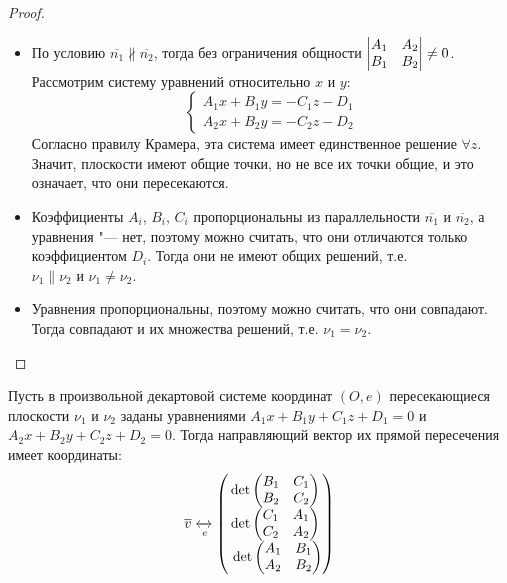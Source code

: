 \begin{proof}~
	\begin{itemize}
		\item По условию $\overline{n_1} \nparallel \overline{n_2}$, тогда без ограничения общности $\begin{vmatrix}A_1 & A_2\\B_1 & B_2\end{vmatrix} \hm{\ne} 0$. Рассмотрим систему уравнений относительно $x$ и $y$:
		\[\left\{
		\begin{aligned}
		A_1x + B_1y = -C_1z -D_1\\
		A_2x + B_2y = -C_2z -D_2
		\end{aligned}
		\right.
		\]
		Согласно правилу Крамера, эта система имеет единственное решение $\forall z$. Значит, плоскости имеют общие точки, но не все их точки общие, и это означает, что они пересекаются.
		\item Коэффициенты $A_i$, $B_i$, $C_i$ пропорциональны из параллельности $\overline{n_1}$ и $\overline{n_2}$, а уравнения "--- нет, поэтому можно считать, что они отличаются только коэффициентом $D_i$. Тогда они не имеют общих решений, т.\:е. $\nu_1 \parallel \nu_2 \text{ и } \nu_1 \ne \nu_2$.
		\item Уравнения пропорциональны, поэтому можно считать, что они совпадают. Тогда совпадают и их множества решений, т.\:е. $\nu_1 = \nu_2$.
	\end{itemize}
\end{proof}

\begin{proposition}
	Пусть в произвольной декартовой системе координат $(O, e)$ пересекающиеся плоскости $\nu_1$ и $\nu_2$ заданы уравнениями $A_1x+B_1y+C_1z+D_1 = 0$ и $A_2x+B_2y+C_2z+D_2 = 0$. Тогда направляющий вектор их прямой пересечения имеет координаты:
	\[\overline{v} \xleftrightarrow[e]{}
	\begin{pmatrix}
	\det\begin{pmatrix}
	B_1&C_1\\
	B_2&C_2
	\end{pmatrix}\\
	\det\begin{pmatrix}
	C_1&A_1\\
	C_2&A_2
	\end{pmatrix}\\~
	\det\begin{pmatrix}
	A_1&B_1\\
	A_2&B_2
	\end{pmatrix}
	\end{pmatrix}\]
\end{proposition}

